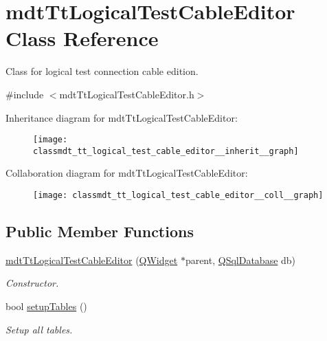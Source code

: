 \hypertarget{classmdt_tt_logical_test_cable_editor}{\section{mdt\-Tt\-Logical\-Test\-Cable\-Editor Class Reference}
\label{classmdt_tt_logical_test_cable_editor}
}


Class for logical test connection cable edition.  




{\ttfamily \#include $<$mdt\-Tt\-Logical\-Test\-Cable\-Editor.\-h$>$}



Inheritance diagram for mdt\-Tt\-Logical\-Test\-Cable\-Editor\-:\nopagebreak
\begin{figure}[H]
\begin{center}
\leavevmode
\texttt{[image: classmdt\_tt\_logical\_test\_cable\_editor\_\_inherit\_\_graph]}
\end{center}
\end{figure}


Collaboration diagram for mdt\-Tt\-Logical\-Test\-Cable\-Editor\-:\nopagebreak
\begin{figure}[H]
\begin{center}
\leavevmode
\texttt{[image: classmdt\_tt\_logical\_test\_cable\_editor\_\_coll\_\_graph]}
\end{center}
\end{figure}
\subsection*{Public Member Functions}
\begin{DoxyCompactItemize}
\item 
\hyperlink{classmdt_tt_logical_test_cable_editor_ac37787fc205e943c1295c22951cc4885}{mdt\-Tt\-Logical\-Test\-Cable\-Editor} (\hyperlink{class_q_widget}{Q\-Widget} $\ast$parent, \hyperlink{class_q_sql_database}{Q\-Sql\-Database} db)
\begin{DoxyCompactList}\small\item\em Constructor. \end{DoxyCompactList}\item 
bool \hyperlink{classmdt_tt_logical_test_cable_editor_a5b2d693df300953d3af67dad87cb5a0b}{setup\-Tables} ()
\begin{DoxyCompactList}\small\item\em Setup all tables. \end{DoxyCompactList}\end{DoxyCompactItemize}
